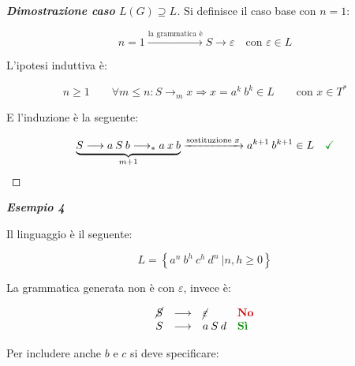 \documentclass[a4paper]{article}
\begin{document}
	\begin{proof}[\textcolor{Blue3}{\textbf{Dimostrazione caso} $L\left(G\right) \supseteq L$}]
		Si definisce il caso base con $n = 1$:
		
		\begin{equation*}
			n = 1 \xrightarrow{\text{la grammatica è}} S \rightarrow \varepsilon \hspace{1em} \text{con } \varepsilon \in L
		\end{equation*}
		
		\noindent
		L'ipotesi induttiva è:
		
		\begin{equation*}
			n \ge 1 \hspace{2em} \forall m \le n : S \longrightarrow_{m} x \Longrightarrow x = a^{k} \: b^{k} \in L \hspace{2em} \text{con } x \in T^{*}
		\end{equation*}
		
		\noindent
		E l'induzione è la seguente:
		
		\begin{equation*}
			\underbrace{S \longrightarrow a \: S \: b \longrightarrow_{*} a \: x \: b}_{m + 1} \xrightarrow{\text{sostituzione } x} a^{k+1} \: b^{k+1} \in L \hspace{1em} \textcolor{Green4}{\textbf{\checkmark}}
		\end{equation*}
	\end{proof}

	\newpage
	
	\noindent
	\textcolor{Green4}{\textbf{\emph{Esempio 4}}}
	
	\noindent
	Il linguaggio è il seguente:
	
	\begin{equation*}
		L = \left\{a^{n} \: b^{h} \: c^{h} \: d^{n} \: \left| n, h \ge 0 \right.\right\}
	\end{equation*}

	\noindent
	La grammatica generata non è con $\varepsilon$, invece è:
	
	\begin{equation*}
		\begin{array}{llll}
			\cancel{S} & \longrightarrow & \cancel{\varepsilon} & \textcolor{Red3}{\textbf{No}} \\
			S & \longrightarrow & a \: S \: d & \textcolor{Green4}{\textbf{Sì}}
		\end{array}
	\end{equation*}

	\noindent
	Per includere anche $b$ e $c$ si deve specificare:
	
\end{document}
